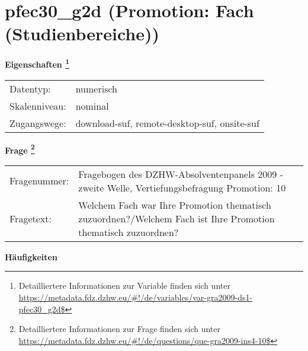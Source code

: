 
    \setcounter{footnote}{0}

    \vspace*{-1.8cm}
	\section{pfec30\_g2d (Promotion: Fach (Studienbereiche))}
	\label{section:pfec30_g2d}



    \vspace*{0.5cm}
    \noindent\textbf{Eigenschaften
	\footnote{Detailliertere Informationen zur Variable finden sich unter
		\url{https://metadata.fdz.dzhw.eu/\#!/de/variables/var-gra2009-ds1-pfec30_g2d$}}}\\
	\begin{tabularx}{\hsize}{@{}lX}
	Datentyp: & numerisch \\
	Skalenniveau: & nominal \\
	Zugangswege: &
	  download-suf, 
	  remote-desktop-suf, 
	  onsite-suf
 \\
    \end{tabularx}



				\vspace*{0.5cm}
                \noindent\textbf{Frage
	                \footnote{Detailliertere Informationen zur Frage finden sich unter
		              \url{https://metadata.fdz.dzhw.eu/\#!/de/questions/que-gra2009-ins4-10$}}}\\
				\begin{tabularx}{\hsize}{@{}lX}
					Fragenummer: &
					  Fragebogen des DZHW-Absolventenpanels 2009 - zweite Welle, Vertiefungsbefragung Promotion:
					  10
 \\
					Fragetext: & Welchem Fach war Ihre Promotion thematisch zuzuordnen?/Welchem Fach ist Ihre Promotion thematisch zuzuordnen? \\
				\end{tabularx}





        		\vspace*{0.5cm}
                \noindent\textbf{Häufigkeiten}

